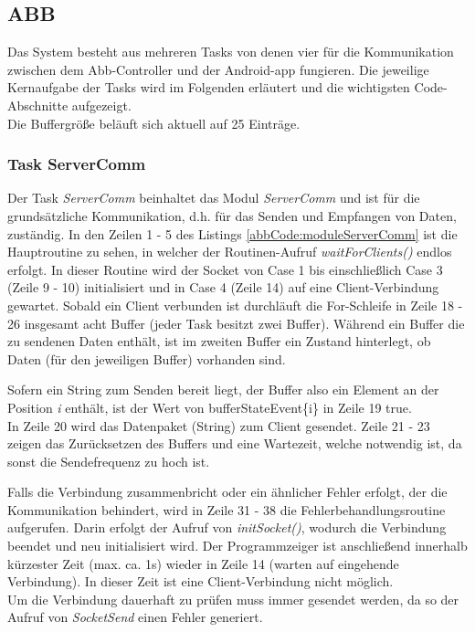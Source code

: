 \subsection{ABB}
\label{sec:ChapterABB}
Das System besteht aus mehreren Tasks von denen vier für die Kommunikation 
zwischen dem Abb-Controller und der Android-\gls{app} fungieren.
Die jeweilige Kernaufgabe der Tasks wird im Folgenden erläutert und die 
wichtigsten Code-Abschnitte aufgezeigt. \\
Die Buffergröße beläuft sich aktuell auf 25 Einträge.

\subsubsection{Task ServerComm}
Der Task \textit{ServerComm} beinhaltet das Modul \textit{ServerComm} und ist 
für die 
grundsätzliche Kommunikation, d.h. für 
das Senden und 
Empfangen von Daten, zuständig.
In den Zeilen 1 - 5 des Listings \ref{abbCode:moduleServerComm} ist die 
Hauptroutine zu sehen, in welcher der Routinen-Aufruf \textit{waitForClients()} 
endlos erfolgt.
In dieser Routine wird der Socket von Case 1 bis einschließlich Case 3 
(Zeile 9 - 10) initialisiert und in Case 4 (Zeile 14) auf eine 
Client-Verbindung gewartet. 
Sobald ein Client verbunden ist durchläuft die For-Schleife in Zeile 18 - 26 
insgesamt acht Buffer (jeder Task besitzt zwei Buffer). Während ein Buffer die 
zu sendenen Daten enthält, ist im zweiten Buffer ein Zustand hinterlegt, ob 
Daten (für den jeweiligen Buffer) vorhanden sind.

Sofern ein String zum Senden bereit liegt, der Buffer also ein Element an der 
Position \textit{i} enthält, ist der Wert von bufferStateEvent\{i\} in Zeile 19 
true.\\
In Zeile 20 wird das Datenpaket (String) zum Client gesendet.
Zeile 21 - 23 zeigen das Zurücksetzen des Buffers und eine Wartezeit, welche 
notwendig ist, da sonst die Sendefrequenz zu hoch ist.

Falls die Verbindung zusammenbricht oder ein ähnlicher Fehler erfolgt, der die 
Kommunikation behindert, wird in Zeile 31 - 38 die Fehlerbehandlungsroutine 
aufgerufen. Darin erfolgt der Aufruf von \textit{initSocket()}, wodurch die 
Verbindung beendet und neu initialisiert wird. Der Programmzeiger ist 
anschließend innerhalb kürzester Zeit (max. ca. 1s) wieder in Zeile 14 (warten 
auf eingehende Verbindung). In dieser Zeit ist eine Client-Verbindung nicht 
möglich.\\
Um die Verbindung dauerhaft zu prüfen muss immer gesendet werden, da so der 
Aufruf von \textit{SocketSend} einen Fehler generiert.



